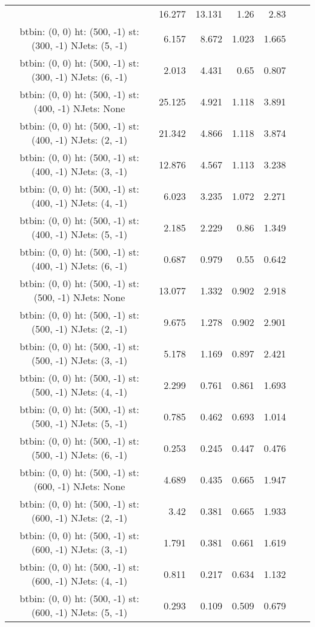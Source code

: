 \documentclass[12pt]{paper}
\begin{document}
\begin{landscape}
\begin{longtable}{c|r|r|r|r|r|r}
 & 16.277 & 13.131 & 1.26 & 2.83\\
btbin:  (0, 0) ht:  (500, -1) st:  (300, -1) NJets:  (5, -1)
 & 6.157 & 8.672 & 1.023 & 1.665\\
btbin:  (0, 0) ht:  (500, -1) st:  (300, -1) NJets:  (6, -1)
 & 2.013 & 4.431 & 0.65 & 0.807\\
btbin:  (0, 0) ht:  (500, -1) st:  (400, -1) NJets:  None
 & 25.125 & 4.921 & 1.118 & 3.891\\
btbin:  (0, 0) ht:  (500, -1) st:  (400, -1) NJets:  (2, -1)
 & 21.342 & 4.866 & 1.118 & 3.874\\
btbin:  (0, 0) ht:  (500, -1) st:  (400, -1) NJets:  (3, -1)
 & 12.876 & 4.567 & 1.113 & 3.238\\
btbin:  (0, 0) ht:  (500, -1) st:  (400, -1) NJets:  (4, -1)
 & 6.023 & 3.235 & 1.072 & 2.271\\
btbin:  (0, 0) ht:  (500, -1) st:  (400, -1) NJets:  (5, -1)
 & 2.185 & 2.229 & 0.86 & 1.349\\
btbin:  (0, 0) ht:  (500, -1) st:  (400, -1) NJets:  (6, -1)
 & 0.687 & 0.979 & 0.55 & 0.642\\
btbin:  (0, 0) ht:  (500, -1) st:  (500, -1) NJets:  None
 & 13.077 & 1.332 & 0.902 & 2.918\\
btbin:  (0, 0) ht:  (500, -1) st:  (500, -1) NJets:  (2, -1)
 & 9.675 & 1.278 & 0.902 & 2.901\\
btbin:  (0, 0) ht:  (500, -1) st:  (500, -1) NJets:  (3, -1)
 & 5.178 & 1.169 & 0.897 & 2.421\\
btbin:  (0, 0) ht:  (500, -1) st:  (500, -1) NJets:  (4, -1)
 & 2.299 & 0.761 & 0.861 & 1.693\\
btbin:  (0, 0) ht:  (500, -1) st:  (500, -1) NJets:  (5, -1)
 & 0.785 & 0.462 & 0.693 & 1.014\\
btbin:  (0, 0) ht:  (500, -1) st:  (500, -1) NJets:  (6, -1)
 & 0.253 & 0.245 & 0.447 & 0.476\\
btbin:  (0, 0) ht:  (500, -1) st:  (600, -1) NJets:  None
 & 4.689 & 0.435 & 0.665 & 1.947\\
btbin:  (0, 0) ht:  (500, -1) st:  (600, -1) NJets:  (2, -1)
 & 3.42 & 0.381 & 0.665 & 1.933\\
btbin:  (0, 0) ht:  (500, -1) st:  (600, -1) NJets:  (3, -1)
 & 1.791 & 0.381 & 0.661 & 1.619\\
btbin:  (0, 0) ht:  (500, -1) st:  (600, -1) NJets:  (4, -1)
 & 0.811 & 0.217 & 0.634 & 1.132\\
btbin:  (0, 0) ht:  (500, -1) st:  (600, -1) NJets:  (5, -1)
 & 0.293 & 0.109 & 0.509 & 0.679\\

\end{longtable}
\end{landscape}
\end{document}
